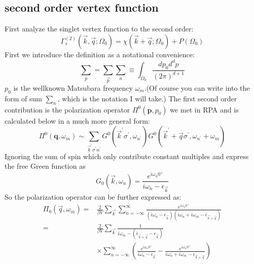 \documentclass[12pt]{article}
\numberwithin{equation}{section}
\begin{document}
\subsection{second order vertex function}
First analyze the singlet vertex function to the second order:
\begin{equation}
	\Gamma_{s}^{(2)}\left(\vec{k}, \vec{q} ; \Omega_{0}\right)=\chi\left(\vec{k}+\vec{q} ; \Omega_{0}\right)+P\left(\Omega_{0}\right)
	\end{equation}
	First we introduce the definition as a notational convenience:
	\begin{equation}
		\sum_{p} =\sum_{\vec{p}}\sum_n \equiv \int_{\Omega_{0}} \frac{d p_{0} d^{d} p}{(2 \pi)^{d+1}}
		\end{equation}
		$p_0$ is the wellknown Matsubara frequency $\omega_m$.(Of course you can write into the form of sum $\sum_{n}$, which is the notation I will take.) The first second order contribution is the polarization operator $\Pi^{0}\left(\mathbf{p}, p_{0}\right)$ we met in RPA and is calculated below in a much more general form:
		\begin{equation}
			\Pi^{0}\left(\mathbf{q}, \omega_{m}\right)\sim \sum_{\vec{k}^{\prime} \sigma^{\prime} n^{\prime}} G^{0}\left(\vec{k}^{\prime} \sigma^{\prime}, \omega_{n^{\prime}}\right) G^{0}\left(\vec{k}^{\prime}+\vec{q} \sigma^{\prime}, \omega_{n^{\prime}}+\omega_{m}\right)
			\end{equation}
Ignoring the sum of spin which only contribute constant multiples and express the free Green function as 
\begin{equation}
	G_0(\vec{k},\omega_n)=\frac{e^{i \omega_{n} 0^{+}}}{i \omega_{n}-\epsilon_{\vec{k}}}
\end{equation}
	So the polarization operator can be further expressed as:
	\begin{equation}
		\begin{aligned}
			\Pi_{0}\left(\vec{q}, \omega_{m}\right)  = &\frac{2}{\beta V} \sum_{\vec{k}} \sum_{n=-\infty}^{\infty} \frac{e^{i \omega_{n} 0^{+}}}{\left(i \omega_{n}-\epsilon_{\vec{k}} \right)\left(i \omega_{n}+i \omega_{m}-\bar{\epsilon}_{\vec{k}+\vec{q}}\right)} \\
			=& \frac{2}{\beta V} \sum_{\vec{k}} \frac{1}{i \omega_{m}-\left(\bar{\epsilon}_{\vec{k}+\vec{q}}-\epsilon_{\vec{k}}\right) } \\
			& \times \sum_{n=-\infty}^{\infty}\left(\frac{e^{i \omega_{n} 0^{+}}}{i \omega_{n}-\epsilon_{\vec{k}} }-\frac{e^{i \omega_{n} 0^{+}}}{i \omega_{n}+i \omega_{m}-\epsilon_{\vec{k}+\vec{q}}}\right)
		\end{aligned}
		\end{equation}
\end{document}
